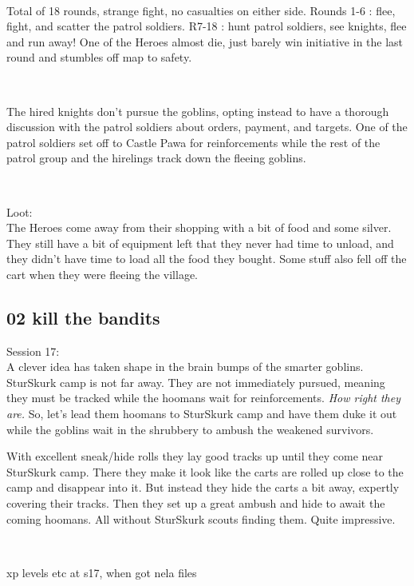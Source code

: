 \

Total of 18 rounds, strange fight, no casualties on either side.
Rounds 1-6 : flee, fight, and scatter the patrol soldiers.                 %
R7-18 : hunt patrol soldiers, see knights, flee and run away!              %
One of the Heroes almost die, just barely win initiative in the last round and stumbles off map to safety.

\

The hired knights don't pursue the goblins, opting instead to have a thorough discussion with the patrol soldiers about orders, payment, and targets. One of the patrol soldiers set off to Castle Pawa for reinforcements while the rest of the patrol group and the hirelings track down the fleeing goblins.

\

Loot:\\
The Heroes come away from their shopping with a bit of food and some silver. They still have a bit of equipment left that they never had time to unload, and they didn't have time to load all the food they bought. Some stuff also fell off the cart when they were fleeing the village.


\subsection*{02 kill the bandits}
\label{playthroughkillthebandits}

\forceindent Session 17:\\                                              %
A clever idea has taken shape in the brain bumps of the smarter goblins. SturSkurk camp is not far away. They are not immediately pursued, meaning they must be tracked while the hoomans wait for reinforcements. \emph{How right they are.} So, let's lead them hoomans to SturSkurk camp and have them duke it out while the goblins wait in the shrubbery to ambush the weakened survivors.

With excellent sneak/hide rolls they lay good tracks up until they come near SturSkurk camp. There they make it look like the carts are rolled up close to the camp and disappear into it. But instead they hide the carts a bit away, expertly covering their tracks. Then they set up a great ambush and hide to await the coming hoomans. All without SturSkurk scouts finding them. Quite impressive.

\

\todo xp levels etc at s17, when got nela files

